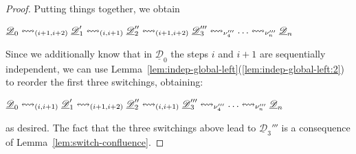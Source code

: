 \documentclass[a4paper,UKenglish,cleveref,pdftex,thm-restate,numberwithinsect,anonymous]{lipics}
\newcommand{\dder}[1]{\mathscr{#1}}
\newcommand{\der}[1]{\underline{\dder{#1}}}
\newcommand{\shift}[1]{\ensuremath{\mathrel{{\leftrightsquigarrow}_{#1}}}}
\begin{document}
\begin{proof}
  Putting things together, we obtain
  \begin{center}
    $\der{D}_0 \shift{\transp{i+1}[i+2]} \der{D}_1' \shift{\transp{i}}
    \der{D}_2'' \shift{\transp{i+1}[i+2]} \der{D}_3''' \shift{\nu_4'''}\ldots \shift{\nu_n'''} \der{D}_n$
  \end{center}
  Since we additionally know that in $\der{D}_0$ the steps $i$ and
  $i+1$ are sequentially independent, we can use
  Lemma~\ref{lem:indep-global-left}(\ref{lem:indep-global-left:2}) to
  reorder the first three switchings, obtaining:
  \begin{center}
    $\der{D}_0 \shift{\transp{i}} \der{D}_1' \shift{\transp{i+1}[i+2]}
    \der{D}_2'' \shift{\transp{i}} \der{D}_3''' \shift{\nu_4'''}\ldots \shift{\nu_n'''} \der{D}_n$
  \end{center}
  as desired.  The fact that the three switchings above lead to
  $\der{D}_3'''$ is a consequence of Lemma~\ref{lem:switch-confluence}.
\end{proof}
\end{document}
